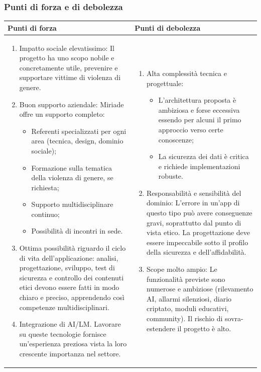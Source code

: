 \documentclass[a4paper,11pt]{article}
\begin{document}
\subsubsection{Punti di forza e di debolezza}
{\footnotesize
\begin{tabularx}{\textwidth}{|X|X|}
\hline
\rowcolor{lightgray!40} %
\textbf{Punti di forza} & \textbf{Punti di debolezza} \\
\hline
\begin{enumerate}
\item Impatto sociale elevatissimo: Il progetto ha uno scopo nobile e concretamente utile, prevenire e supportare vittime di violenza di genere.
\item Buon supporto aziendale: Miriade offre un supporto completo:
\begin{itemize}
 \item Referenti specializzati per ogni area (tecnica, design, dominio sociale);
 \item Formazione sulla tematica della violenza di genere, se richiesta;
 \item Supporto multidisciplinare continuo;
 \item Possibilità di incontri in sede.
\end{itemize}
\item Ottima possibilità riguardo il ciclo di vita dell'applicazione: analisi, progettazione, sviluppo, test di sicurezza e controllo dei contenuti etici devono essere fatti in modo chiaro e preciso, apprendendo così competenze multidisciplinari.
\item Integrazione di AI/LM. Lavorare su queste tecnologie fornisce un'esperienza preziosa vista la loro crescente importanza nel settore.
\end{enumerate}
 & \begin{enumerate}
\item Alta complessità tecnica e progettuale:
\begin{itemize}
 \item L'architettura proposta è ambiziosa e forse eccessiva essendo per alcuni il primo approccio verso certe conoscenze;
 \item La sicurezza dei dati è critica e richiede implementazioni robuste.
\end{itemize}
\item 	Responsabilità e sensibilità del dominio: L'errore in un'app di questo tipo può avere conseguenze gravi, soprattutto dal punto di vista etico. La progettazione deve essere impeccabile sotto il profilo della sicurezza e dell'affidabilità.
\item Scope molto ampio: Le funzionalità previste sono numerose e ambiziose (rilevamento AI, allarmi silenziosi, diario criptato, moduli educativi, community). Il rischio di sovra-estendere il progetto è alto.
\end{enumerate} \\
\hline
\end{tabularx}
}
\end{document}
